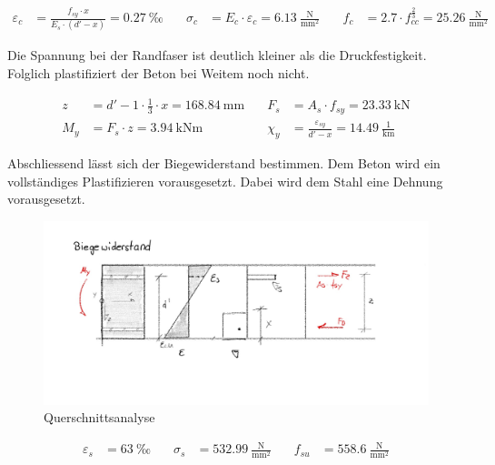\documentclass[
  11pt,
  letterpaper,
]{scrreprt}
\begin{document}
\[
\begin{aligned}
\varepsilon_{c}& = \frac{f_{sy} \cdot x}{E_{s} \cdot \left({d}' - x\right)} = 0.27 \ \mathrm{‰} \quad & \sigma_{c}& = E_{c} \cdot \varepsilon_{c} = 6.13 \ \frac{\mathrm{N}}{\mathrm{mm}^{2}} \quad & f_{c}& = 2.7 \cdot f_{cc}^{\frac{2}{3}} = 25.26 \ \frac{\mathrm{N}}{\mathrm{mm}^{2}} \end{aligned}
\]

Die Spannung bei der Randfaser ist deutlich kleiner als die
Druckfestigkeit. Folglich plastifiziert der Beton bei Weitem noch nicht.

\[
\begin{aligned}
z& = {d}' - 1 \cdot \frac{1}{3} \cdot x = 168.84 \ \mathrm{mm} \quad & F_{s}& = A_{s} \cdot f_{sy} = 23.33 \ \mathrm{kN} \\ 
M_{y}& = F_{s} \cdot z = 3.94 \ \mathrm{kNm} \quad & \chi_{y}& = \frac{\varepsilon_{sy}}{{d}' - x} = 14.49 \ \frac{1}{\mathrm{km}} \end{aligned}
\]

Abschliessend lässt sich der Biegewiderstand bestimmen. Dem Beton wird
ein vollständiges Plastifizieren vorausgesetzt. Dabei wird dem Stahl
eine Dehnung vorausgesetzt.

\begin{figure}[H]

{\centering \includegraphics{../imgs/thesis_skizzen-3.jpg}

}

\caption{Querschnittsanalyse}

\end{figure}%

\[
\begin{aligned}
\varepsilon_{s}& = 63 \ \mathrm{‰} \quad & \sigma_{s}& = 532.99 \ \frac{\mathrm{N}}{\mathrm{mm}^{2}} \quad & f_{su}& = 558.6 \ \frac{\mathrm{N}}{\mathrm{mm}^{2}} \end{aligned}
\]
\end{document}
